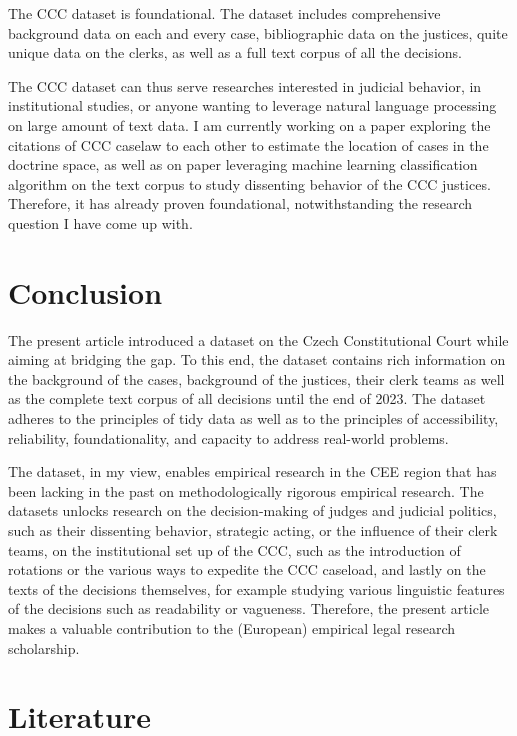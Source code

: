 \documentclass[
  11pt,
]{article}
\begin{document}
The CCC dataset is foundational. The dataset includes comprehensive
background data on each and every case, bibliographic data on the
justices, quite unique data on the clerks, as well as a full text corpus
of all the decisions.

The CCC dataset can thus serve researches interested in judicial
behavior, in institutional studies, or anyone wanting to leverage
natural language processing on large amount of text data. I am currently
working on a paper exploring the citations of CCC caselaw to each other
to estimate the location of cases in the doctrine space, as well as on
paper leveraging machine learning classification algorithm on the text
corpus to study dissenting behavior of the CCC justices. Therefore, it
has already proven foundational, notwithstanding the research question I
have come up with.

\hypertarget{conclusion}{%
\section{Conclusion}\label{conclusion}}

The present article introduced a dataset on the Czech Constitutional
Court while aiming at bridging the gap. To this end, the dataset
contains rich information on the background of the cases, background of
the justices, their clerk teams as well as the complete text corpus of
all decisions until the end of 2023. The dataset adheres to the
principles of tidy data as well as to the principles of accessibility,
reliability, foundationality, and capacity to address real-world
problems.

The dataset, in my view, enables empirical research in the CEE region
that has been lacking in the past on methodologically rigorous empirical
research. The datasets unlocks research on the decision-making of judges
and judicial politics, such as their dissenting behavior, strategic
acting, or the influence of their clerk teams, on the institutional set
up of the CCC, such as the introduction of rotations or the various ways
to expedite the CCC caseload, and lastly on the texts of the decisions
themselves, for example studying various linguistic features of the
decisions such as readability or vagueness. Therefore, the present
article makes a valuable contribution to the (European) empirical legal
research scholarship.

\vspace{30pt}

\hypertarget{literature}{%
\section*{Literature}\label{literature}}
\end{document}
